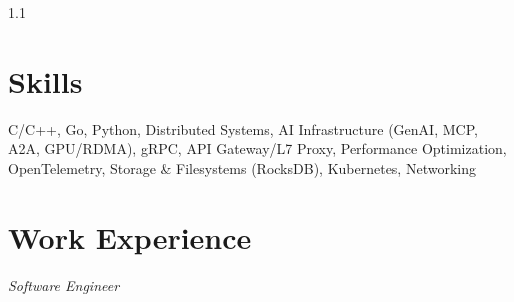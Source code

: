 \documentclass{yijiem}
\begin{document}
\begin{spacing}{1.1}
\end{spacing}

\section{Skills}
    C/C++, Go, Python, Distributed Systems, AI Infrastructure (GenAI, MCP, A2A, GPU/RDMA), gRPC, API Gateway/L7 Proxy, Performance Optimization, OpenTelemetry, Storage \& Filesystems (RocksDB), \mbox{Kubernetes}, Networking

\section{Work Experience}
    \textit{\small Software Engineer}
\end{document}
